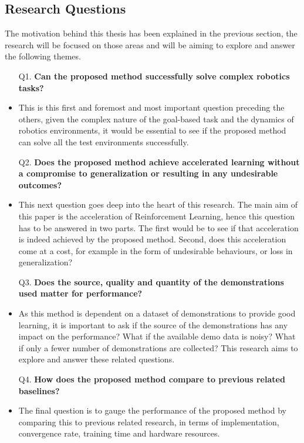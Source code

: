 \subsection{Research Questions}

The motivation behind this thesis has been explained in the previous section, the research will be focused on those areas and will be aiming to explore and answer the following themes. \\

\begin{itemize}[leftmargin=0.7in]
    \item[Q1.  ] \textbf{Can the proposed method successfully solve complex robotics tasks?} \\
    
    \item This is this first and foremost and most important question preceding the others, given the complex nature of the goal-based task and the dynamics of robotics environments, it would be essential to see if the proposed method can solve all the test environments successfully. \\

    \item[Q2.  ] \textbf{Does the proposed method achieve accelerated learning without a compromise to generalization or resulting in any undesirable outcomes?} \\
    
    \item This next question goes deep into the heart of this research. The main aim of this paper is the acceleration of Reinforcement Learning, hence this question has to be answered in two parts. The first would be to see if that acceleration is indeed achieved by the proposed method. Second, does this acceleration come at a cost, for example in the form of undesirable behaviours, or loss in generalization? \\
    
    \item[Q3.  ] \textbf{Does the source, quality and quantity of the demonstrations used matter for performance?} \\
    
    \item As this method is dependent on a dataset of demonstrations to provide good learning, it is important to ask if the source of the demonstrations has any impact on the performance? What if the available demo data is noisy? What if only a fewer number of demonstrations are collected? This research aims to explore and answer these related questions. \\

    \item[Q4.  ] \textbf{How does the proposed method compare to previous related baselines?} \\
    
    \item The final question is to gauge the performance of the proposed method by comparing this to previous related research, in terms of implementation, convergence rate, training time and hardware resources. \\
\end{itemize}

